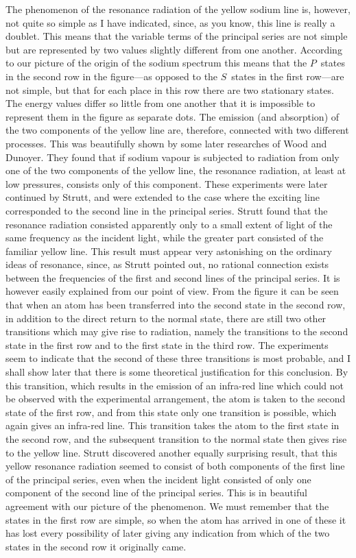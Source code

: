 The phenomenon of the resonance radiation of the yellow sodium
line is, however, not quite so simple as I have indicated, since, as
you know, this line is really a doublet. This means that the variable
terms of the principal series are not simple but are represented by
two values slightly different from one another. According to our
picture of the origin of the sodium spectrum this means that the
$P$~states in the second row in the figure---as opposed to the $S$~states
in the first row---are not simple, but that for each place in this row
there are two stationary states. The energy values differ so little
from one another that it is impossible to represent them in the
figure as separate dots. The emission (and absorption) of the two
components of the yellow line are, therefore, connected with two
different processes. This was beautifully shown by some later researches
of Wood and Dunoyer. They found that if sodium vapour
is subjected to radiation from only one of the two components of
the yellow line, the resonance radiation, at least at low pressures,
consists only of this component. These experiments were later
continued by Strutt, and were extended to the case where the
exciting line corresponded to the second line in the principal series.
Strutt found that the resonance radiation consisted apparently only
to a small extent of light of the same frequency as the incident
light, while the greater part consisted of the familiar yellow line.
This result must appear very astonishing on the ordinary ideas of
resonance, since, as Strutt pointed out, no rational connection exists
between the frequencies of the first and second lines of the principal
series. It is however easily explained from our point of view. From
the figure it can be seen that when an atom has been transferred
into the second state in the second row, in addition to the direct
return to the normal state, there are still two other transitions
which may give rise to radiation, namely the transitions to the
second state in the first row and to the first state in the third row.
The experiments seem to indicate that the second of these three
transitions is most probable, and I shall show later that there is
some theoretical justification for this conclusion. By this transition,
which results in the emission of an infra-red line which could not
be observed with the experimental arrangement, the atom is taken
to the second state of the first row, and from this state only
one transition is possible, which again gives an infra-red line. This
transition takes the atom to the first state in the second row, and
the subsequent transition to the normal state then gives rise to the
yellow line. Strutt discovered another equally surprising result,
that this yellow resonance radiation seemed to consist of both
components of the first line of the principal series, even when the
incident light consisted of only one component of the second line
of the principal series. This is in beautiful agreement with our
picture of the phenomenon. We must remember that the states in
the first row are simple, so when the atom has arrived in one of
these it has lost every possibility of later giving any indication
from which of the two states in the second row it originally came.

